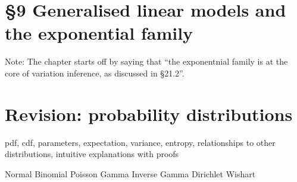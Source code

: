 \documentclass{amsart}
\begin{document}
\section{\S 9 Generalised linear models and the exponential family}
Note: The chapter starts off by saying that ``the exponentnial family is at the core
of variation inference, as discussed in \S 21.2''.

\section{Revision: probability distributions}
pdf, cdf, parameters, expectation, variance, entropy, relationships to other distributions,
intuitive explanations
with proofs

Normal
Binomial
Poisson
Gamma
Inverse Gamma
Dirichlet
Wishart
\end{document}
